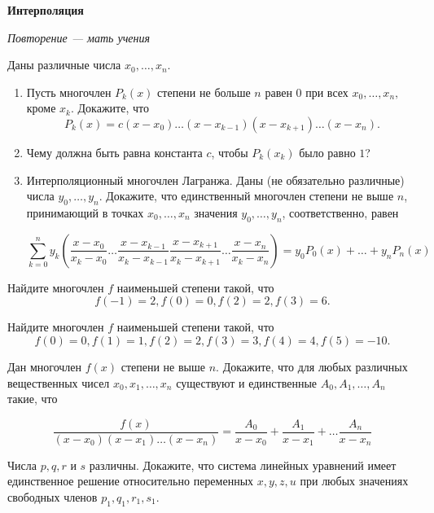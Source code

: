 \documentclass{article}
\begin{document}
    \large

    \begin{center}
        \textbf{Интерполяция}
    \end{center}

    \epigraph{\textit{Повторение --- мать учения}}{}
    \begin{enumerate_boxed}
        \item Даны различные числа $x_0, \dotsc , x_n.$
        \begin{enumerate}
            \item Пусть многочлен $P_k(x)$ степени не больше $n$ равен $0$ при всех $x_0, \dotsc , x_n,$ кроме $x_k$.
            Докажите, что \[P_k(x) = c(x - x_0)\dotsc(x - x_{k-1})(x - x_{k+1})\dotsc(x - x_n).\]

            \item Чему должна быть равна константа $c$, чтобы $P_k(x_k)$ было равно $1$?

            \item Интерполяционный многочлен Лагранжа.
            Даны (не обязательно различные) числа $y_0, \dotsc , y_n$.
            Докажите, что единственный многочлен степени не выше $n$, принимающий в точках $x_0, \dotsc , x_n$ значения $y_0, \dotsc , y_n$, соответственно,
            равен

            \[\sum_{k = 0}^{n} y_k \left(\frac{x - x_0}{x_k - x_0}  \dotsc  \frac{x - x_{k-1}}{x_k - x_{k-1}} \frac{x - x_{k+1}}{x_k - x_{k+1}} \dotsc \frac{x - x_{n}}{x_k - x_{n}}\right) = y_{0}P_0(x) + \dotsc + y_{n}P_n(x)\]
        \end{enumerate}

        \item Найдите многочлен $f$ наименьшей степени такой, что \[f(-1) = 2, f(0) = 0, f(2) = 2, f(3) = 6.\]

        \item Найдите многочлен $f$ наименьшей степени такой, что \[f(0) = 0, f(1) = 1, f(2) = 2, f(3) = 3, f(4) = 4, f(5) = -10.\]

        \item Дан многочлен $f(x)$ степени не выше $n$.
        Докажите, что для любых различных вещественных чисел $x_0, x_1, \dotsc , x_n$ существуют и единственные $A_0, A_1, \dotsc , A_n$ такие, что

        \[\frac{f(x)}{(x - x_0)(x-x_1)\dotsc(x-x_n)} = \frac{A_0}{x-x_0} + \frac{A_1}{x-x_1} + \dotsc \frac{A_n}{x-x_n}\]

        \item Числа $p, q, r$ и $s$ различны.
        Докажите, что система линейных уравнений имеет единственное решение относительно переменных $x, y, z, u$ при любых значениях свободных членов $p_1, q_1, r_1, s_1.$


\end{enumerate_boxed}
\end{document}
